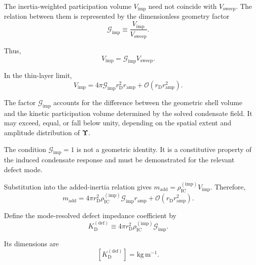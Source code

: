 The inertia-weighted participation volume $V_{\mathrm{imp}}$ need not coincide with $V_{\mathrm{sweep}}$. The relation between them is represented by the dimensionless geometry factor
\begin{equation}
    \mathcal{G}_{\mathrm{imp}} \equiv \frac{ V_{\mathrm{imp}} }{ V_{\mathrm{sweep}} }.
\end{equation}

Thus,
\begin{equation}
    V_{\mathrm{imp}} = \mathcal{G}_{\mathrm{imp}} V_{\mathrm{sweep}}.
\end{equation}

In the thin-layer limit,
\begin{equation}
    V_{\mathrm{imp}} = 4\pi \mathcal{G}_{\mathrm{imp}} r_{\mathrm{D}}^2 r_{\mathrm{amp}} + \mathcal{O} \left( r_{\mathrm{D}}r_{\mathrm{amp}}^2 \right).
\end{equation}

The factor $\mathcal{G}_{\mathrm{imp}}$ accounts for the difference between the geometric shell volume and the kinetic participation volume determined by the solved condensate field. It may exceed, equal, or fall below unity, depending on the spatial extent and amplitude distribution of $\boldsymbol{\Upsilon}$.

The condition $\mathcal{G}_{\mathrm{imp}}=1$ is not a geometric identity. It is a constitutive property of the induced condensate response and must be demonstrated for the relevant defect mode.

Substitution into the added-inertia relation gives $m_{\mathrm{add}} = \rho_{\mathrm{IC}}^{(\mathrm{imp})} V_{\mathrm{imp}}$. Therefore,
\begin{equation}
    m_{\mathrm{add}} = 4\pi r_{\mathrm{D}}^2 \rho_{\mathrm{IC}}^{(\mathrm{imp})} \mathcal{G}_{\mathrm{imp}} r_{\mathrm{amp}} + \mathcal{O} \left( r_{\mathrm{D}}r_{\mathrm{amp}}^2 \right).
\end{equation}

Define the mode-resolved defect impedance coefficient by
\begin{equation}
    \boxed{ K_{\mathrm{D}}^{(\mathrm{def})} \equiv 4\pi r_{\mathrm{D}}^2 \rho_{\mathrm{IC}}^{(\mathrm{imp})} \mathcal{G}_{\mathrm{imp}} }.
\end{equation}

Its dimensions are
\begin{equation}
    \left[ K_{\mathrm{D}}^{(\mathrm{def})} \right] = \mathrm{kg\,m^{-1}}.
\end{equation}

